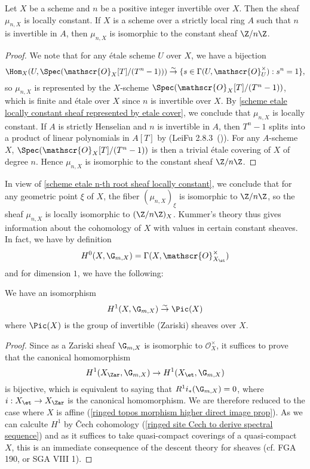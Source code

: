 \begin{proposition}\label{scheme etale n-th root sheaf locally constant}
Let $X$ be a scheme and $n$ be a positive integer invertible over $X$. Then the sheaf $\mu_{n,X}$ is locally constant. If $X$ is a scheme over a strictly local ring $A$ such that $n$ is invertible in $A$, then $\mu_{n,X}$ is isomorphic to the constant sheaf $\Z/n\Z$.
\end{proposition}
\begin{proof}
We note that for any \'etale scheme $U$ over $X$, we have a bijection
\[\Hom_X(U,\Spec(\mathscr{O}_X[T]/(T^n-1))) \stackrel{\sim}{\to} \{s\in\Gamma(U,\mathscr{O}_U^\times):s^n=1\},\]
so $\mu_{n,X}$ is represented by the $X$-scheme $\Spec(\mathscr{O}_X[T]/(T^n-1))$, which is finite and \'etale over $X$ since $n$ is invertible over $X$. By \cref{scheme etale locally constant sheaf represented by etale cover}, we conclude that $\mu_{n,X}$ is locally constant. If $A$ is strictly Henselian and $n$ is invertible in $A$, then $T^n-1$ splits into a product of linear polynomials in $A[T]$ by (LeiFu 2.8.3~()). For any $A$-scheme $X$, $\Spec(\mathscr{O}_X[T]/(T^n-1))$ is then a trivial \'etale covering of $X$ of degree $n$. Hence $\mu_{n,X}$ is isomorphic to the constant sheaf $\Z/n\Z$.
\end{proof}
In view of \cref{scheme etale n-th root sheaf locally constant}, we conclude that for any geometric point $\xi$ of $X$, the fiber $(\mu_{n,X})_\xi$ is isomorphic to $\Z/n\Z$, so the sheaf $\mu_{n,X}$ is locally isomorphic to $(\Z/n\Z)_X$. Kummer's theory thus gives information about the cohomology of $X$ with values in certain constant sheaves. In fact, we have by definition
\[H^0(X,\G_{m,X})=\Gamma(X,\mathscr{O}_{X_\et}^\times)\]
and for dimension $1$, we have the following:
\begin{theorem}\label{scheme etale Hilbert theorem 90}
We have an isomorphism
\[H^1(X,\G_{m,X}) \stackrel{\sim}{\to} \Pic(X)\]
where $\Pic(X)$ is the group of invertible (Zariski) sheaves over $X$.
\end{theorem}
\begin{proof}
Since as a Zariski sheaf $\G_{m,X}$ is isomorphic to $\mathscr{O}_X^\times$, it suffices to prove that the canonical homomorphism
\[H^1(X_\Zar,\G_{m,X})\to H^1(X_\et,\G_{m,X})\]
is bijective, which is equivalent to saying that $R^1i_*(\G_{m,X})=0$, where $i:X_\et\to X_\Zar$ is the canonical homomorphism. We are therefore reduced to the case where $X$ is affine (\cref{ringed topos morphism higher direct image prop}). As we can calculte $H^1$ by \v{C}ech cohomology (\cref{ringed site Cech to derive spectral sequence}) and as it suffices to take quasi-compact coverings of a quasi-compact $X$, this is an immediate consequence of the descent theory for sheaves (cf. FGA 190, or SGA VIII 1).
\end{proof}

